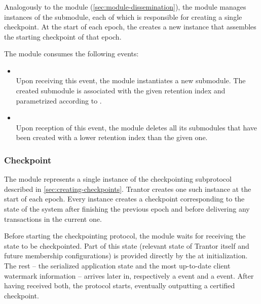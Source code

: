 \documentclass{article}
\begin{document}
\subsubsection{}

Analogously to the  module (\cref{sec:module-dissemination}),
the  module manages instances of the  submodule,
each of which is responsible for creating a single checkpoint.
At the start of each epoch, the  creates a new  instance that assembles the starting checkpoint of that epoch.

The  module consumes the following events:

\begin{itemize}

    \item {}\\
    Upon receiving this event, the  module instantiates a new  submodule.
    The created submodule is associated with the given retention index and parametrized according to .

    \item {}\\
    Upon reception of this event,
    the  module deletes all its submodules that have been created with a lower retention index than the given one.

\end{itemize}

\subsubsection{Checkpoint}

The  module represents a single instance of the checkpointing subprotocol described in \cref{sec:creating-checkpoints}.
Trantor creates one such instance at the start of each epoch.
Every instance creates a checkpoint corresponding to the state of the system after finishing the previous epoch
and before delivering any transactions in the current one.

Before starting the checkpointing protocol, the  module waits for receiving the state to be checkpointed.
Part of this state (relevant state of Trantor itself and future membership configurations)
is provided directly by the  at initialization.
The rest -- the serialized application state and the most up-to-date client watermark information --
arrives later in, respectively a  event and a  event.
After having received both, the protocol starts, eventually outputting a certified checkpoint.
\end{document}
